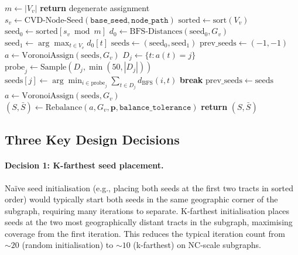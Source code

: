 \begin{algorithm}[t]
\caption{\cvd{}-\textsc{Bisect}($G_v$, $k_L$, $k_R$, $\mathtt{base\_seed}$,
  $\mathtt{node\_path}$, $\mathtt{cvd\_iters}$, $\mathtt{balance\_tolerance}$)}
\label{alg:cvd}
\begin{algorithmic}[1]
\State $m \gets |V_v|$
  \textbf{return} degenerate assignment 
\EndIf
\State $s_v \gets \mathrm{CVD\text{-}Node\text{-}Seed}(\mathtt{base\_seed}, \mathtt{node\_path})$
\State $\mathrm{sorted} \gets \mathrm{sort}(V_v)$
\State $\mathrm{seed}_0 \gets \mathrm{sorted}[s_v \bmod m]$
\State $d_0 \gets \mathrm{BFS\text{-}Distances}(\mathrm{seed}_0, G_v)$
\State $\mathrm{seed}_1 \gets \arg\max_{t \in V_v} d_0[t]$
\State $\mathrm{seeds} \gets (\mathrm{seed}_0, \mathrm{seed}_1)$
\State $\mathrm{prev\_seeds} \gets (-1, -1)$
  \State $a \gets \mathrm{VoronoiAssign}(\mathrm{seeds}, G_v)$
    \State $D_j \gets \{t : a(t) = j\}$
    \State $\mathrm{probe}_j \gets \mathrm{Sample}(D_j, \min(50, |D_j|))$
    \State $\mathrm{seeds}[j] \gets \arg\min_{i \in \mathrm{probe}_j}
           \sum_{t \in D_j} d_{\mathrm{BFS}}(i, t)$
  \EndFor
    \textbf{break}
  \EndIf
  \State $\mathrm{prev\_seeds} \gets \mathrm{seeds}$
\EndFor
\State $a \gets \mathrm{VoronoiAssign}(\mathrm{seeds}, G_v)$
\State $(S, \bar{S}) \gets \mathrm{Rebalance}(a, G_v, \mathbf{p}, \mathtt{balance\_tolerance})$
\State \textbf{return} $(S, \bar{S})$
\end{algorithmic}
\end{algorithm}

\subsection{Three Key Design Decisions}

\paragraph{Decision 1: K-farthest seed placement.}
Na\"{i}ve seed initialisation (e.g., placing both seeds at the first two tracts
in sorted order) would typically start both seeds in the same geographic corner
of the subgraph, requiring many iterations to separate.
K-farthest initialisation places seeds at the two most geographically distant
tracts in the subgraph, maximising coverage from the first iteration.
This reduces the typical iteration count from $\sim 20$ (random initialisation)
to $\sim 10$ (k-farthest) on NC-scale subgraphs.

